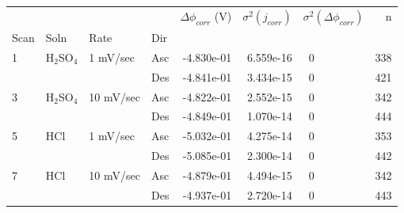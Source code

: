 \begin{tabular}{llllrrlr}
\toprule
  &     &           &     &  $\Delta \phi_{corr}$ (V) &  $\sigma^2(j_{corr})$ & $\sigma^2(\Delta \phi_{corr})$ &    n \\
Scan & Soln & Rate & Dir &                           &                       &                                &      \\
\midrule
1 & H$_2$SO$_4$ & 1 mV/sec & Asc &                -4.830e-01 &             6.559e-16 &                             ~0 &  338 \\
  &     &           & Des &                -4.841e-01 &             3.434e-15 &                             ~0 &  421 \\
3 & H$_2$SO$_4$ & 10 mV/sec & Asc &                -4.822e-01 &             2.552e-15 &                             ~0 &  342 \\
  &     &           & Des &                -4.849e-01 &             1.070e-14 &                             ~0 &  444 \\
5 & HCl & 1 mV/sec & Asc &                -5.032e-01 &             4.275e-14 &                             ~0 &  353 \\
  &     &           & Des &                -5.085e-01 &             2.300e-14 &                             ~0 &  442 \\
7 & HCl & 10 mV/sec & Asc &                -4.879e-01 &             4.494e-15 &                             ~0 &  342 \\
  &     &           & Des &                -4.937e-01 &             2.720e-14 &                             ~0 &  443 \\
\bottomrule
\end{tabular}
